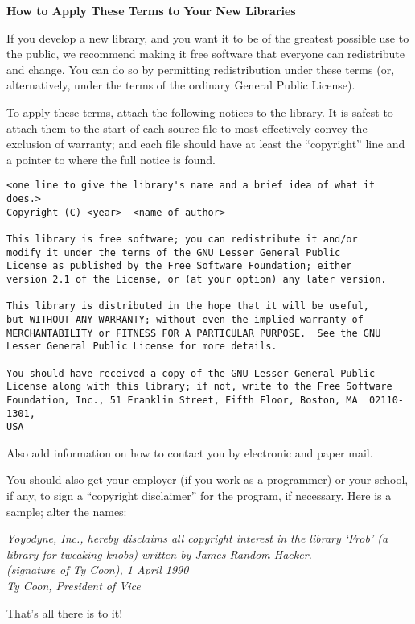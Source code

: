 {\footnotesize
{\medskip\noindent\normalsize\textbf{How to Apply These Terms to Your New Libraries}\smallskip}

If you develop a new library, and you want it to be of the greatest possible 
use to the public, we recommend making it free software that everyone can 
redistribute and change. You can do so by permitting redistribution under these 
terms (or, alternatively, under the terms of the ordinary General Public 
License).

To apply these terms, attach the following notices to the library. It is safest 
to attach them to the start of each source file to most effectively convey the 
exclusion of warranty; and each file should have at least the ``copyright'' line 
and a pointer to where the full notice is found. 

\begin{verbatim}
<one line to give the library's name and a brief idea of what it does.>
Copyright (C) <year>  <name of author>

This library is free software; you can redistribute it and/or
modify it under the terms of the GNU Lesser General Public
License as published by the Free Software Foundation; either
version 2.1 of the License, or (at your option) any later version.

This library is distributed in the hope that it will be useful,
but WITHOUT ANY WARRANTY; without even the implied warranty of
MERCHANTABILITY or FITNESS FOR A PARTICULAR PURPOSE.  See the GNU
Lesser General Public License for more details.

You should have received a copy of the GNU Lesser General Public
License along with this library; if not, write to the Free Software
Foundation, Inc., 51 Franklin Street, Fifth Floor, Boston, MA  02110-1301,
USA
\end{verbatim}

Also add information on how to contact you by electronic and paper mail.

You should also get your employer (if you work as a programmer) or your
school, if any, to sign a ``copyright disclaimer'' for the program, if
necessary.  Here is a sample; alter the names:

\medskip
{\itshape\noindent Yoyodyne, Inc., hereby disclaims all copyright interest in 
the library `Frob' (a library for tweaking knobs) written by James Random 
Hacker.\\
\noindent (signature of Ty Coon), 1 April 1990\\
\noindent Ty Coon, President of Vice}
\medskip

That's all there is to it! 

} %
